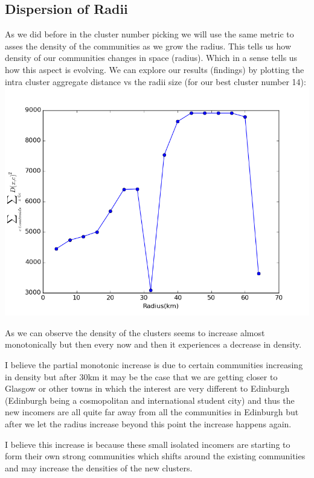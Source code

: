 \documentclass[10pt,twocolumn]{article}
\begin{document}
\subsection{Dispersion of Radii}

As we did before in the cluster number picking
we will use the same metric to asses the density
of the communities as we grow the radius. This tells us how density of our communities changes
in space (radius). Which in a sense tells us how this aspect is evolving.
\newline\newline
We can explore our results (findings) by plotting the intra cluster aggregate distance vs the radii size (for our best cluster number 14):
\includegraphics[scale=0.34]{pics/radii.png}

As we can observe the density of the clusters
seems to increase almost monotonically but then every now and then it experiences a decrease in density. 

I believe the partial monotonic increase is due to certain communities increasing  in density but after 30km it may be the case that we are getting closer to Glasgow or other towns in which the interest are very different to Edinburgh (Edinburgh being a cosmopolitan and international student city) and thus the new incomers are all quite far away from all the communities in Edinburgh but after we let the radius increase beyond this point the increase happens again.


I believe this increase is because these small isolated incomers are starting to form their own strong communities which shifts around the existing communities and may increase the densities of the new clusters.
\end{document}
